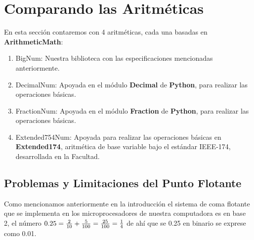 \documentclass[a4paper,10pt,twocolumn]{article}
\begin{document}
\section{Comparando las Aritméticas}\label{sub:comp_aritmetics}
	En esta sección contaremos con 4 aritméticas, cada una basadas en \textbf{ArithmeticMath}:
	\begin{enumerate}
		\item BigNum: Nuestra biblioteca con las especificaciones mencionadas anteriormente.
		
		\item DecimalNum: Apoyada en el módulo \textbf{Decimal} de \textbf{Python}, para realizar las operaciones básicas.
		
		\item FractionNum: Apoyada en el módulo \textbf{Fraction} de \textbf{Python}, para realizar las operaciones básicas.
		
		\item Extended754Num: Apoyada para realizar las operaciones básicas en \textbf{Extended174}, aritmética de base variable bajo el estándar IEEE-174, desarrollada en la
		Facultad. 
		
	\end{enumerate}


\subsection{Problemas y Limitaciones del Punto Flotante}\label{sub:problems_limitations}
	Como mencionamos anteriormente en la introducción el sistema de coma flotante que se implementa en los microprocesadores de nuestra computadora es en base 2, el número $0.25={2\over 10}+{5\over 100}={25\over 100}={1\over 4}$ de ahí que se 0.25 en binario se exprese como 0.01. 
	
\end{document}

